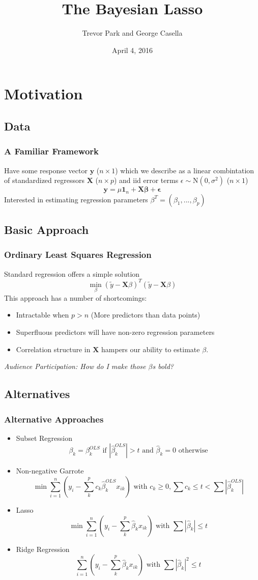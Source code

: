 \documentclass{beamer} %
\title{The Bayesian Lasso}
\author{Trevor Park and George Casella}
\institute{\Large Annelise Wagner\\ \normalsize University of Washington Statistics}
\date{April 4, 2016}
\theoremstyle{definition}
\begin{document}
\begin{frame}
\titlepage
\end{frame}



\section{Motivation}
\subsection{Data}
\begin{frame}
\frametitle{A Familiar Framework}
Have some response vector $\textbf{y}$ ($n \times 1$) which we describe as a linear combintation of standardized regressors $\textbf{X}$ ($n \times p$) and iid error terms $\epsilon \sim \text{N}(0,\sigma^2)$ ($n \times 1$)
\[
\textbf{y} = \mu \textbf{1}_n + \textbf{X}\mathbf{\beta} + \mathbf{\epsilon}
\]
Interested in estimating regression parameters $\beta^T=(\beta_1,...,\beta_p)$
\end{frame}

\subsection{Basic Approach}
\begin{frame}
\frametitle{Ordinary Least Squares Regression}
Standard regression offers a simple solution
\[
\min_\beta (\tilde y - \textbf{X}\beta)^T(\tilde y - \textbf{X}\beta)
\]
This approach has a number of shortcomings:
\begin{itemize}
\item Intractable when $p>n$ (More predictors than data points)
\item Superfluous predictors will have non-zero regression parameters
\item Correlation structure in $\textbf{X}$ hampers our ability to estimate $\beta$.
\end{itemize}
\tiny \emph{Audience Participation: How do I make those $\beta$s bold?}
\end{frame}

\subsection{Alternatives}
\begin{frame}
\frametitle{Alternative Approaches}
\begin{itemize}
\item Subset Regression
\[
\beta_k=\beta^{OLS}_k \text{ if } |\hat\beta^{OLS}_k| > t \text{ and } \hat\beta_k=0 \text{ otherwise}
\]
\item Non-negative Garrote 
\[
\min \sum_{i=1}^n (y_i - \sum_k^p c_k \hat\beta^{OLS}_k x_{ik} ) \text{ with } c_k \geq 0, \sum c_k \leq t < \sum |\hat\beta^{OLS}_k|
\]
\item Lasso
\[
\min \sum_{i=1}^n (y_i - \sum_k^p\hat\beta_k x_{ik} ) \text{ with } \sum |\hat\beta_k| \leq t
\]
\item Ridge Regression
\[
\sum_{i=1}^n (y_i - \sum_k^p\hat\beta_k x_{ik} ) \text{ with } \sum |\hat\beta_k|^2 \leq t
\]
\end{itemize}
\end{frame}
\end{document}
